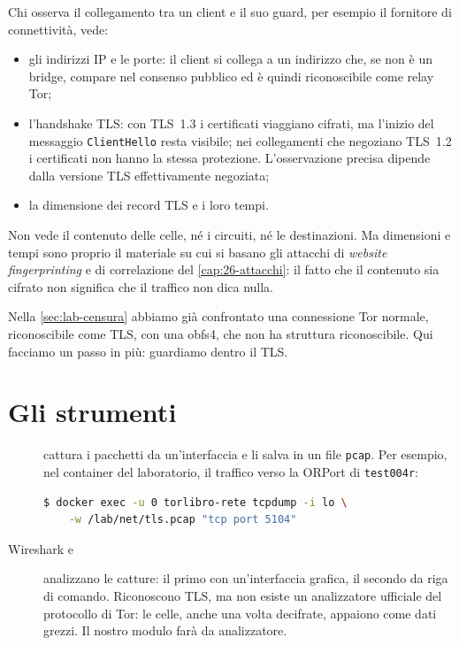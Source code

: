 Chi osserva il collegamento tra un client e il suo guard, per esempio il fornitore di connettività, vede:
\begin{itemize}
  \item gli indirizzi IP e le porte: il client si collega a un indirizzo che, se non è un bridge, compare nel consenso pubblico ed è quindi riconoscibile come relay Tor;
  \item l'handshake TLS: con TLS~1.3 i certificati viaggiano cifrati, ma l'inizio del messaggio \texttt{ClientHello} resta visibile; nei collegamenti che negoziano TLS~1.2 i certificati non hanno la stessa protezione. L'osservazione precisa dipende dalla versione TLS effettivamente negoziata;
  \item la dimensione dei record TLS e i loro tempi.
\end{itemize}
Non vede il contenuto delle celle, né i circuiti, né le destinazioni. Ma dimensioni e tempi sono proprio il materiale su cui si basano gli attacchi di \emph{website fingerprinting} e di correlazione del \cref{cap:26-attacchi}: il fatto che il contenuto sia cifrato non significa che il traffico non dica nulla.

Nella \cref{sec:lab-censura} abbiamo già confrontato una connessione Tor normale, riconoscibile come TLS, con una obfs4, che non ha struttura riconoscibile. Qui facciamo un passo in più: guardiamo dentro il TLS.

\section{Gli strumenti}\label{sec:traffico-strumenti}

\begin{description}
  \item[] cattura i pacchetti da un'interfaccia e li salva in un file \texttt{pcap}. Per esempio, nel container del laboratorio, il traffico verso la ORPort di \texttt{test004r}:
\begin{lstlisting}[language=bash,numbers=none]
$ docker exec -u 0 torlibro-rete tcpdump -i lo \
    -w /lab/net/tls.pcap "tcp port 5104"
\end{lstlisting}
  \item[Wireshark e ] analizzano le catture: il primo con un'interfaccia grafica, il secondo da riga di comando. Riconoscono TLS, ma non esiste un analizzatore ufficiale del protocollo di Tor: le celle, anche una volta decifrate, appaiono come dati grezzi. Il nostro modulo  farà da analizzatore.
\end{description}

